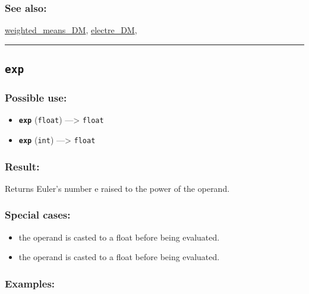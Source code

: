 \documentclass[]{book}
\providecommand{\tightlist}{%
  \setlength{\itemsep}{0pt}\setlength{\parskip}{0pt}}
\theoremstyle{definition}
\theoremstyle{definition}
\theoremstyle{definition}
\theoremstyle{remark}
\begin{document}
\subsubsection{See also:}\label{see-also-89}

\href{OperatorsSZ\#weighted_means_dm}{weighted\_means\_DM},
\href{OperatorsDH\#electre_dm}{electre\_DM},

\begin{center}\rule{0.5\linewidth}{\linethickness}\end{center}

\subsection{\texorpdfstring{\texttt{exp}}{exp}}\label{exp}

\subsubsection{Possible use:}\label{possible-use-160}

\begin{itemize}
\tightlist
\item
  \textbf{\texttt{exp}} (\texttt{float}) ---\textgreater{}
  \texttt{float}
\item
  \textbf{\texttt{exp}} (\texttt{int}) ---\textgreater{} \texttt{float}
\end{itemize}

\subsubsection{Result:}\label{result-154}

Returns Euler's number e raised to the power of the operand.

\subsubsection{Special cases:}\label{special-cases-58}

\begin{itemize}
\tightlist
\item
  the operand is casted to a float before being evaluated.\\
\item
  the operand is casted to a float before being evaluated.
\end{itemize}

\subsubsection{Examples:}\label{examples-119}
\end{document}
